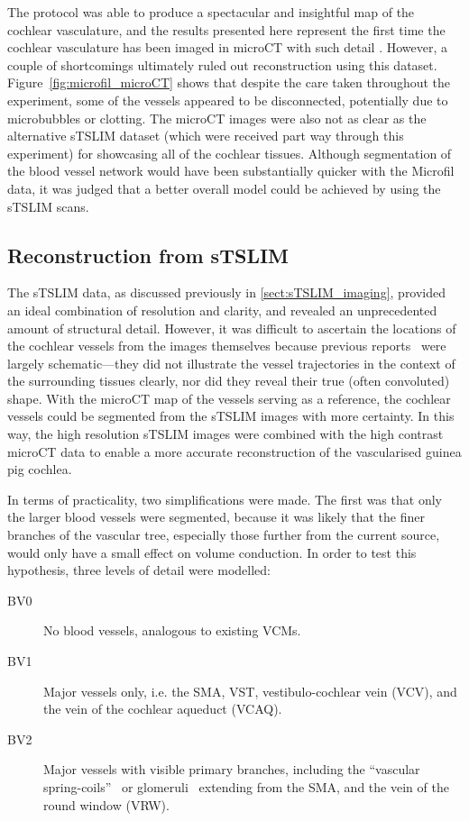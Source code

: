 The protocol was able to produce a spectacular and insightful map of the
cochlear vasculature, and the results presented here represent the first time
the cochlear vasculature has been imaged in microCT with such detail \insitu.
However, a couple of shortcomings ultimately ruled out reconstruction using this
dataset. Figure~\ref{fig:microfil_microCT} shows that despite the care taken
throughout the experiment, some of the vessels appeared to be disconnected,
potentially due to microbubbles or clotting. The microCT images were also not as
clear as the alternative sTSLIM dataset (which were received part way through
this experiment) for showcasing all of the cochlear tissues. Although
segmentation of the blood vessel network would have been substantially quicker
with the Microfil data, it was judged that a better overall model could be
achieved by using the sTSLIM scans.

\subsection{Reconstruction from sTSLIM}

The sTSLIM data, as discussed previously in \ref{sect:sTSLIM_imaging}, provided
an ideal combination of resolution and clarity, and revealed an unprecedented
amount of structural detail. However, it was difficult to ascertain the
locations of the cochlear vessels from the images themselves because previous
reports~\cite{axelsson1968,nakashima2003} were largely schematic---they did not
illustrate the vessel trajectories in the context of the surrounding tissues
clearly, nor did they reveal their true (often convoluted) shape. With the
microCT map of the vessels serving as a reference, the cochlear vessels could be
segmented from the sTSLIM images with more certainty. In this way, the high
resolution sTSLIM images were combined with the high contrast microCT data to
enable a more accurate reconstruction of the vascularised guinea pig cochlea.

In terms of practicality, two simplifications were made. The first was
that only the larger blood vessels were segmented, because it was likely that
the finer branches of the vascular tree, especially those further from the
current source, would only have a small effect on volume conduction. In order to
test this hypothesis, three levels of detail were modelled:
\begin{description}%
	\item[\textsf{BV0}] No blood vessels, analogous to
	existing VCMs.
	\item[\textsf{BV1}] Major vessels only, i.e. the SMA, VST,
	vestibulo-cochlear vein (VCV), and the vein of the cochlear aqueduct (VCAQ).
	\item[\textsf{BV2}] Major vessels with visible primary branches, including the
	``vascular spring-coils''~\cite{scuderi1952} or glomeruli~\cite{franz1993}
	extending from the SMA, and the vein of the round window (VRW).
\end{description}

